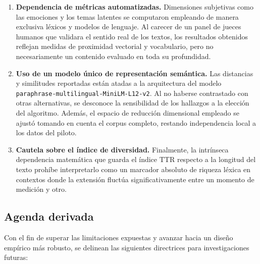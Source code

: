 \documentclass[12pt]{article}
\begin{document}
\begin{enumerate}
		\item \textbf{Dependencia de métricas automatizadas.} Dimensiones subjetivas como las emociones y los temas latentes se computaron empleando de manera exclusiva léxicos y modelos de lenguaje. Al carecer de un panel de jueces humanos que validara el sentido real de los textos, los resultados obtenidos reflejan medidas de proximidad vectorial y vocabulario, pero no necesariamente un contenido evaluado en toda su profundidad.
		
		\item \textbf{Uso de un modelo único de representación semántica.} Las distancias y similitudes reportadas están atadas a la arquitectura del modelo \texttt{paraphrase-multilingual-MiniLM-L12-v2}. Al no haberse contrastado con otras alternativas, se desconoce la sensibilidad de los hallazgos a la elección del algoritmo. Además, el espacio de reducción dimensional empleado se ajustó tomando en cuenta el corpus completo, restando independencia local a los datos del piloto.
		
		\item \textbf{Cautela sobre el índice de diversidad.} Finalmente, la intrínseca dependencia matemática que guarda el índice TTR respecto a la longitud del texto prohíbe interpretarlo como un marcador absoluto de riqueza léxica en contextos donde la extensión fluctúa significativamente entre un momento de medición y otro.
	\end{enumerate}
	
	\subsection{Agenda derivada}
	
	Con el fin de superar las limitaciones expuestas y avanzar hacia un diseño empírico más robusto, se delinean las siguientes directrices para investigaciones futuras:
	
\end{document}
